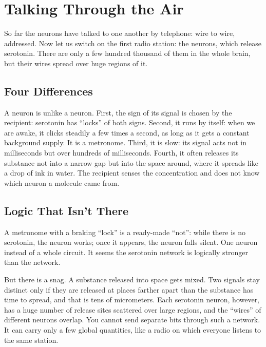 \chapter{Talking Through the Air}


So far the neurons have talked to one another by telephone: wire to wire, addressed. Now let us switch on the first radio station: the  neurons, which release serotonin. There are only a few hundred thousand of them in the whole brain, but their wires spread over huge regions of it.

\section*{Four Differences}

A  neuron is unlike a  neuron. First, the sign of its signal is chosen by the recipient: serotonin has ``locks'' of both signs. Second, it runs by itself: when we are awake, it clicks steadily a few times a second, as long as it gets a constant background supply. It is a metronome. Third, it is slow: its signal acts not in milliseconds but over hundreds of milliseconds. Fourth, it often releases its substance not into a narrow gap but into the space around, where it spreads like a drop of ink in water. The recipient senses the concentration and does not know which neuron a molecule came from.

\section*{Logic That Isn't There}

A metronome with a braking ``lock'' is a ready-made ``not'': while there is no serotonin, the neuron works; once it appears, the neuron falls silent. One neuron instead of a whole circuit. It seems the serotonin network is logically stronger than the  network.

But there is a snag. A substance released into space gets mixed. Two signals stay distinct only if they are released at places farther apart than the substance has time to spread, and that is tens of micrometers. Each serotonin neuron, however, has a huge number of release sites scattered over large regions, and the ``wires'' of different neurons overlap. You cannot send separate bits through such a network. It can carry only a few global quantities, like a radio on which everyone listens to the same station.

